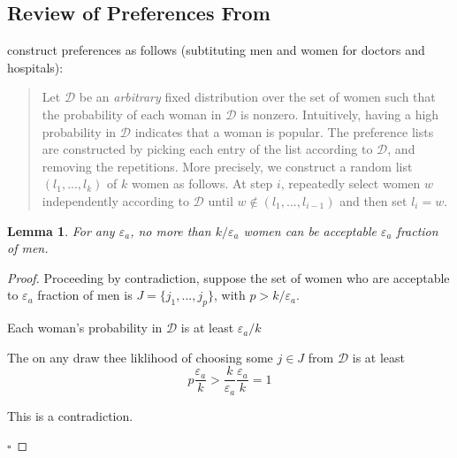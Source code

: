 \documentclass[WP]{AEA}
\newtheorem{lemma}{Lemma}
\begin{document}
\subsection{Review of Preferences From \cite{Immorlica2005}} \label{appendix:immorlica_pref}

\cite{Immorlica2005} construct preferences as follows (subtituting men and women for doctors and hospitals):
\begin{quote}
	Let $\mathcal{D}$ be an \emph{arbitrary} fixed distribution over the set of women such that the probability of each woman in 
	$\mathcal{D}$ is nonzero. Intuitively, having a high probability in $\mathcal{D}$ indicates that a woman is popular. 
	The preference lists are constructed by picking each entry of the list according to $\mathcal{D}$, and removing the repetitions. More precisely, we construct a random list $(l_1, ..., l_k)$
	of $k$ women as follows. At step $i$, repeatedly select women $w$ independently according to $\mathcal{D}$ until $w \notin (l_1, ..., l_{i-1})$ and then set $l_i = w$.
\end{quote}

\begin{lemma}
	For any $\varepsilon_a$, no more than $k/\varepsilon_a$ women can be acceptable $\varepsilon_a$ fraction of men.
\end{lemma}
\begin{proof}
	Proceeding by contradiction, suppose the set of women who are acceptable to $\varepsilon_a$ fraction of men is $J = \{j_1,..., j_p\}$, with $p > k/\varepsilon_a$. 

	Each woman's probability in $\mathcal{D}$ is at least $\varepsilon_a/k$

	The on any draw thee liklihood of choosing some $j\in J$ from $\mathcal{D}$ is at least $$p \frac{\varepsilon_a}{k} > \frac{k}{\varepsilon_a}\frac{\varepsilon_a}{k} = 1$$

	This is a contradiction.

	$\square$


\end{proof}
\end{document}

